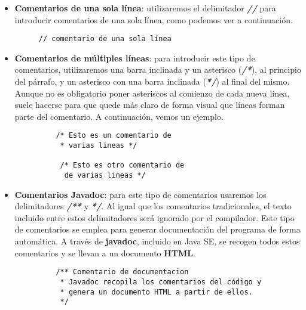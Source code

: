 \begin{itemize}
    \item \textbf{Comentarios de una sola línea}: utilizaremos el delimitador \textbf{\textit{//}} para introducir comentarios de una sola línea, como podemos ver a continuación.

    \begin{figure}[H]
        \begin{tcolorbox}[sharp corners, colback=yellow!30, colframe=white!20]
            \scriptsize
\begin{verbatim}
// comentario de una sola línea
\end{verbatim}
        \end{tcolorbox}
    \end{figure}

    \item \textbf{Comentarios de múltiples líneas}: para introducir este tipo de comentarios, utilizaremos una barra inclinada y un asterisco (\textbf{\textit{/*}}), al principio del párrafo, y un asterisco con una barra inclinada (\textbf{\textit{*/}}) al final del mismo. Aunque no es obligatorio poner asteriscos al comienzo de cada nueva línea, suele hacerse para que quede más claro de forma visual que líneas forman parte del comentario. A continuación, vemos un ejemplo.

    \begin{figure}[H]
    \begin{tcolorbox}[sharp corners, colback=yellow!30, colframe=white!20]
        \scriptsize
\begin{verbatim}
    /* Esto es un comentario de
     * varias lineas */

     /* Esto es otro comentario de
      de varias lineas */
\end{verbatim}
    \end{tcolorbox}
\end{figure}

    \item \textbf{Comentarios Javadoc}: para este tipo de comentarios usaremos los delimitadores \textbf{\textit{/**}} y \textbf{\textit{*/}}. Al igual que los comentarios tradicionales, el texto incluido entre estos delimitadores será ignorado por el compilador. Este tipo de comentarios se emplea para generar documentación del programa de forma automática. A través de \textbf{javadoc}, incluido en Java SE, se recogen todos estos comentarios y se llevan a un documento \textbf{HTML}.

    \begin{figure}[H]
    \begin{tcolorbox}[sharp corners, colback=yellow!30, colframe=white!20]
        \scriptsize
\begin{verbatim}
    /** Comentario de documentacion
     * Javadoc recopila los comentarios del código y
     * genera un documento HTML a partir de ellos.
     */
\end{verbatim}
    \end{tcolorbox}
\end{figure}

\end{itemize}

